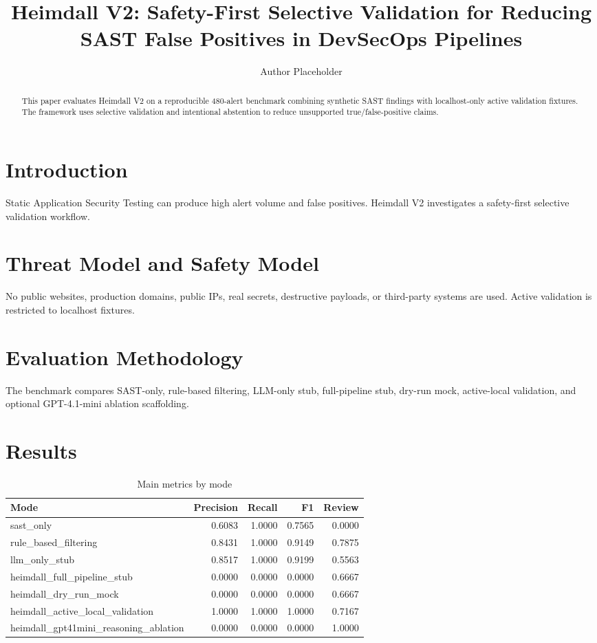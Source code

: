 \documentclass[conference]{IEEEtran}
\title{Heimdall V2: Safety-First Selective Validation for Reducing SAST False Positives in DevSecOps Pipelines}
\author{Author Placeholder}
\begin{document}
\maketitle
\begin{abstract}
This paper evaluates Heimdall V2 on a reproducible 480-alert benchmark combining synthetic SAST findings with localhost-only active validation fixtures. The framework uses selective validation and intentional abstention to reduce unsupported true/false-positive claims.
\end{abstract}
\section{Introduction}
Static Application Security Testing can produce high alert volume and false positives. Heimdall V2 investigates a safety-first selective validation workflow.
\section{Threat Model and Safety Model}
No public websites, production domains, public IPs, real secrets, destructive payloads, or third-party systems are used. Active validation is restricted to localhost fixtures.
\section{Evaluation Methodology}
The benchmark compares SAST-only, rule-based filtering, LLM-only stub, full-pipeline stub, dry-run mock, active-local validation, and optional GPT-4.1-mini ablation scaffolding.
\section{Results}
\begin{table}[h]
\centering
\caption{Main metrics by mode}
\begin{tabular}{lrrrr}
\toprule
Mode & Precision & Recall & F1 & Review \\
\midrule
sast\_only & 0.6083 & 1.0000 & 0.7565 & 0.0000 \\
rule\_based\_filtering & 0.8431 & 1.0000 & 0.9149 & 0.7875 \\
llm\_only\_stub & 0.8517 & 1.0000 & 0.9199 & 0.5563 \\
heimdall\_full\_pipeline\_stub & 0.0000 & 0.0000 & 0.0000 & 0.6667 \\
heimdall\_dry\_run\_mock & 0.0000 & 0.0000 & 0.0000 & 0.6667 \\
heimdall\_active\_local\_validation & 1.0000 & 1.0000 & 1.0000 & 0.7167 \\
heimdall\_gpt41mini\_reasoning\_ablation & 0.0000 & 0.0000 & 0.0000 & 1.0000 \\
\bottomrule
\end{tabular}
\end{table}
\end{document}
